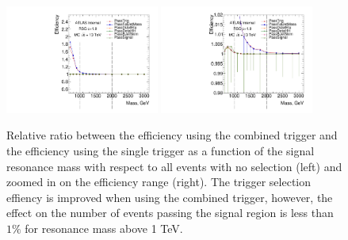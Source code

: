 
\begin{figure}[htbp!]
\begin{center}
\includegraphics[width=0.45\textwidth,angle=-90]{figures/boosted/Trigger/evtsel_test_noveto_Efficiency_All_ref_full.pdf}
\includegraphics[width=0.45\textwidth,angle=-90]{figures/boosted/Trigger/evtsel_test_noveto_Efficiency_All_ref_zoom.pdf}
  \caption{Relative ratio between the efficiency using the combined trigger and the efficiency using the single trigger as a function of the signal resonance mass with respect to all events with no selection (left) and zoomed in on the efficiency range (right). The trigger selection effiency is improved when using the combined trigger, however, the effect on the number of events passing the signal region is less than $1\%$ for resonance mass above 1 TeV.}
\label{fig:app-trig-releff-mass}
\end{center}
\end{figure}
